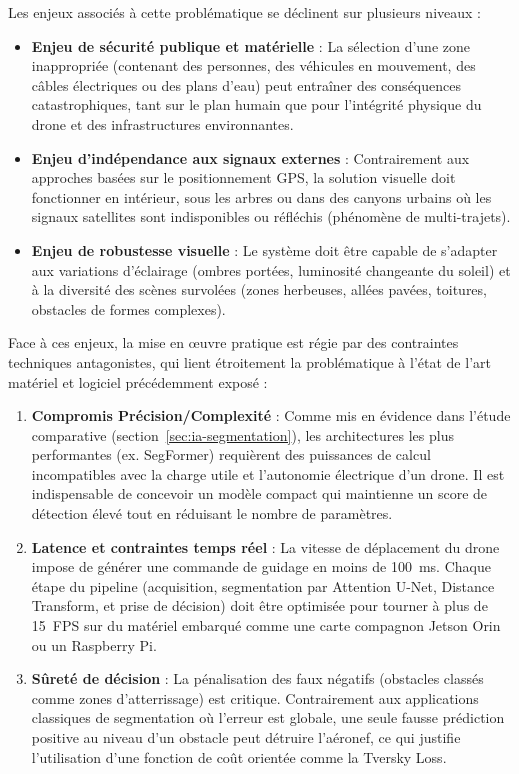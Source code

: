 Les enjeux associés à cette problématique se déclinent sur plusieurs niveaux :
\begin{itemize}[leftmargin=1.8em, itemsep=4pt]
  \item \textbf{Enjeu de sécurité publique et matérielle} : La sélection d'une zone inappropriée (contenant des personnes, des véhicules en mouvement, des câbles électriques ou des plans d'eau) peut entraîner des conséquences catastrophiques, tant sur le plan humain que pour l'intégrité physique du drone et des infrastructures environnantes.
  \item \textbf{Enjeu d'indépendance aux signaux externes} : Contrairement aux approches basées sur le positionnement GPS, la solution visuelle doit fonctionner en intérieur, sous les arbres ou dans des canyons urbains où les signaux satellites sont indisponibles ou réfléchis (phénomène de multi-trajets).
  \item \textbf{Enjeu de robustesse visuelle} : Le système doit être capable de s'adapter aux variations d'éclairage (ombres portées, luminosité changeante du soleil) et à la diversité des scènes survolées (zones herbeuses, allées pavées, toitures, obstacles de formes complexes).
\end{itemize}

Face à ces enjeux, la mise en œuvre pratique est régie par des contraintes techniques antagonistes, qui lient étroitement la problématique à l'état de l'art matériel et logiciel précédemment exposé :
\begin{enumerate}[leftmargin=2em, itemsep=4pt, label=\textbf{\arabic*.}]
  \item \textbf{Compromis Précision/Complexité} : Comme mis en évidence dans l'étude comparative (section~\ref{sec:ia-segmentation}), les architectures les plus performantes (ex. SegFormer) requièrent des puissances de calcul incompatibles avec la charge utile et l'autonomie électrique d'un drone. Il est indispensable de concevoir un modèle compact qui maintienne un score de détection élevé tout en réduisant le nombre de paramètres.
  \item \textbf{Latence et contraintes temps réel} : La vitesse de déplacement du drone impose de générer une commande de guidage en moins de 100~ms. Chaque étape du pipeline (acquisition, segmentation par Attention U-Net, Distance Transform, et prise de décision) doit être optimisée pour tourner à plus de 15~FPS sur du matériel embarqué comme une carte compagnon Jetson Orin ou un Raspberry Pi.
  \item \textbf{Sûreté de décision} : La pénalisation des faux négatifs (obstacles classés comme zones d'atterrissage) est critique. Contrairement aux applications classiques de segmentation où l'erreur est globale, une seule fausse prédiction positive au niveau d'un obstacle peut détruire l'aéronef, ce qui justifie l'utilisation d'une fonction de coût orientée comme la Tversky Loss.
\end{enumerate}

